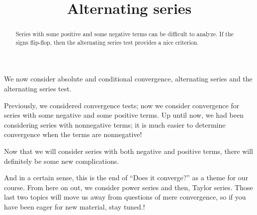 \documentclass{ximera}
\title{Alternating series}
\begin{document}
\begin{abstract}
  Series with some positive and some negative terms can be difficult to analyze.  If the signs flip-flop, then the alternating series test provides a nice criterion.
\end{abstract}

\maketitle

We now consider absolute and conditional convergence, alternating
series and the alternating series test.

Previously, we considered convergence tests; now we consider
convergence for series with some negative and some positive terms.  Up
until now, we had been considering series with nonnegative terms; it
is much easier to determine convergence when the terms are
nonnegative!


Now that we will consider series with both negative and positive
terms, there will definitely be some new complications.

\begin{remark}
  And in a certain sense, this is the end of ``Does it converge?'' as
  a theme for our course.  From here on out, we consider power series
  and then, Taylor series.  Those last two topics will move us away
  from questions of mere convergence, so if you have been eager for
  new material, stay tuned.!
\end{remark}

\end{document}
